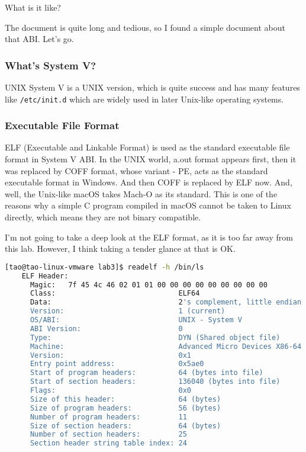 \documentclass{article}
\begin{document}
	What is it like?
	
	The document is quite long and tedious, so I found a simple document\cite{osdev-abi} about that ABI. Let's go.
	\subsubsection{What's System V?}
	UNIX System V is a UNIX version, which is quite success and has many features like \texttt{/etc/init.d} which are widely used in later Unix-like operating systems.
	
	\subsubsection{Executable File Format}
	ELF (Executable and Linkable Format) is used as the standard executable file format in System V ABI. In the UNIX world, a.out format appears first, then it was replaced by COFF format, whose variant - PE, acts as the standard executable format in Windows. And then COFF is replaced by ELF now. And, well, the Unix-like macOS takes Mach-O as its standard. This is one of the reasons why a simple C program compiled in macOS cannot be taken to Linux directly, which means they are not binary compatible.
	
	I'm not going to take a deep look at the ELF format, as it is too far away from this lab. However, I think taking a tender glance at that is OK.
	
	\begin{lstlisting}[language=sh, caption={Taking a look at the ELF file \texttt{/bin/ls}}]
	[tao@tao-linux-vmware lab3]$ readelf -h /bin/ls
	ELF Header:
	  Magic:   7f 45 4c 46 02 01 01 00 00 00 00 00 00 00 00 00 
	  Class:                             ELF64
	  Data:                              2's complement, little endian
	  Version:                           1 (current)
	  OS/ABI:                            UNIX - System V
	  ABI Version:                       0
	  Type:                              DYN (Shared object file)
	  Machine:                           Advanced Micro Devices X86-64
	  Version:                           0x1
	  Entry point address:               0x5ae0
	  Start of program headers:          64 (bytes into file)
	  Start of section headers:          136040 (bytes into file)
	  Flags:                             0x0
	  Size of this header:               64 (bytes)
	  Size of program headers:           56 (bytes)
	  Number of program headers:         11
	  Size of section headers:           64 (bytes)
	  Number of section headers:         25
	  Section header string table index: 24
	
	\end{lstlisting}
	
\end{document}
